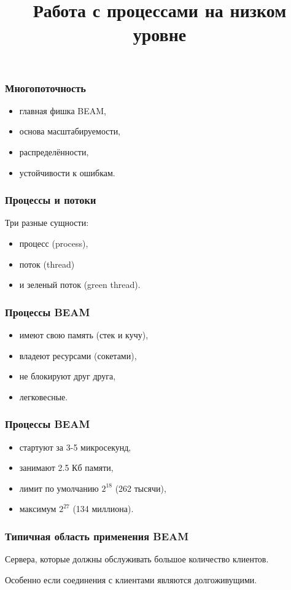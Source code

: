 \documentclass[10pt]{beamer}
\title{Работа с процессами на низком уровне}
\begin{document}
\begin{frame}
  \frametitle{Многопоточность}
  \begin{itemize}
    \item главная фишка BEAM,
    \item основа масштабируемости, 
    \item распределённости,
    \item устойчивости к ошибкам.
  \end{itemize}
\end{frame}

\begin{frame}
  \frametitle{Процессы и потоки}
  Три разные сущности: 
  \begin{itemize}
    \item процесс (process), 
    \item поток (thread) 
    \item и зеленый поток (green thread).
  \end{itemize}
\end{frame}

\begin{frame}
  \frametitle{Процессы BEAM}
  \begin{itemize}
    \item имеют свою память (стек и кучу),
    \item владеют ресурсами (сокетами),
    \item не блокируют друг друга,
    \item легковесные.
  \end{itemize}
\end{frame}

\begin{frame}
  \frametitle{Процессы BEAM}
  \begin{itemize}
    \item стартуют за 3-5 микросекунд,
    \item занимают 2.5 Кб памяти,
    \item лимит по умолчанию $2^{18}$ (262 тысячи),
    \item максимум $2^{27}$ (134 миллиона).
  \end{itemize}
\end{frame}

\begin{frame}
  \frametitle{Типичная область применения BEAM}
  Сервера, которые должны обслуживать большое количество клиентов. 
  \par \bigskip
  Особенно если соединения с клиентами являются долгоживущими.
\end{frame}
\end{document}
